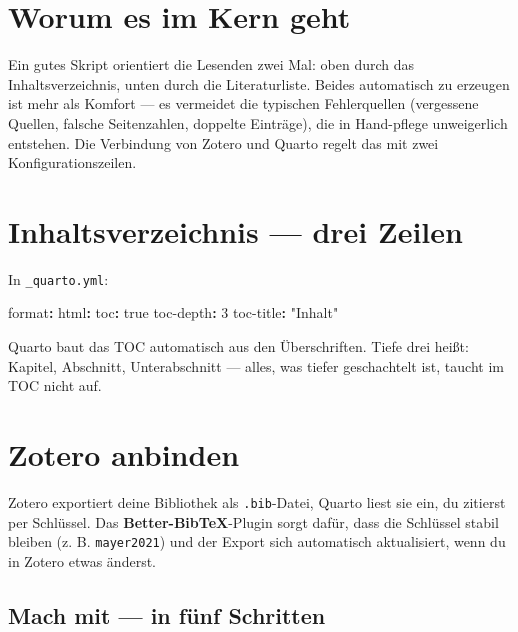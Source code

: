 \documentclass[
  ngerman,
  a4paper,
  DIV=11]{scrreprt}
\newenvironment{Shaded}{\begin{snugshade}}{\end{snugshade}}
\newcommand{\AttributeTok}[1]{\textcolor[rgb]{0.40,0.45,0.13}{#1}}
\newcommand{\CharTok}[1]{\textcolor[rgb]{0.13,0.47,0.30}{#1}}
\newcommand{\DecValTok}[1]{\textcolor[rgb]{0.68,0.00,0.00}{#1}}
\newcommand{\FunctionTok}[1]{\textcolor[rgb]{0.28,0.35,0.67}{#1}}
\newcommand{\KeywordTok}[1]{\textcolor[rgb]{0.00,0.23,0.31}{\textbf{#1}}}
\newcommand{\StringTok}[1]{\textcolor[rgb]{0.13,0.47,0.30}{#1}}
\begin{document}
\section{Worum es im Kern geht}\label{worum-es-im-kern-geht-1}

Ein gutes Skript orientiert die Lesenden zwei Mal: oben durch das
Inhaltsverzeichnis, unten durch die Literaturliste. Beides automatisch
zu erzeugen ist mehr als Komfort --- es vermeidet die typischen
Fehlerquellen (vergessene Quellen, falsche Seitenzahlen, doppelte
Einträge), die in Hand-pflege unweigerlich entstehen. Die Verbindung von
Zotero und Quarto regelt das mit zwei Konfigurationszeilen.

\section{Inhaltsverzeichnis --- drei
Zeilen}\label{inhaltsverzeichnis-drei-zeilen}

In \texttt{\_quarto.yml}:

\begin{Shaded}
\begin{Highlighting}[]
\FunctionTok{format}\KeywordTok{:}
\AttributeTok{  }\FunctionTok{html}\KeywordTok{:}
\AttributeTok{    }\FunctionTok{toc}\KeywordTok{:}\AttributeTok{ }\CharTok{true}
\AttributeTok{    }\FunctionTok{toc{-}depth}\KeywordTok{:}\AttributeTok{ }\DecValTok{3}
\AttributeTok{    }\FunctionTok{toc{-}title}\KeywordTok{:}\AttributeTok{ }\StringTok{"Inhalt"}
\end{Highlighting}
\end{Shaded}

Quarto baut das TOC automatisch aus den Überschriften. Tiefe drei heißt:
Kapitel, Abschnitt, Unterabschnitt --- alles, was tiefer geschachtelt
ist, taucht im TOC nicht auf.

\section{Zotero anbinden}\label{zotero-anbinden}

Zotero exportiert deine Bibliothek als \texttt{.bib}-Datei, Quarto liest
sie ein, du zitierst per Schlüssel. Das \textbf{Better-BibTeX}-Plugin
sorgt dafür, dass die Schlüssel stabil bleiben (z. B.
\texttt{mayer2021}) und der Export sich automatisch aktualisiert, wenn
du in Zotero etwas änderst.

\subsection{Mach mit --- in fünf
Schritten}\label{mach-mit-in-fuxfcnf-schritten}
\end{document}
